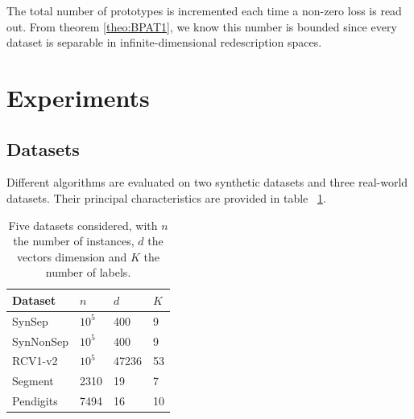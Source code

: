 \documentclass[preprint,12pt,authoryear]{elsarticle}
\begin{document}
The total number of prototypes is incremented each time a non-zero loss is read out. From theorem \ref{theo:BPAT1}, we know this number is bounded since every dataset is separable in infinite-dimensional redescription spaces. 

  



\section{Experiments}
\subsection{Datasets}
\label{subsec:BPAE}

Different algorithms are evaluated on two synthetic datasets and three real-world datasets.  Their principal characteristics are provided in table ~\ref{table:mce}.

\begin{table}[h]
	\caption{Five datasets considered, with $n$ the number of instances, $d$ the vectors dimension and $K$ the number of labels.}
	\label{table:mce}
	\begin{center}
		\begin{tabular}{l l l l}
			{\bf Dataset}  & {\bf $n$} & {\bf $d$} & {\bf $K$}\\
			\hline
			SynSep & $10^5$ 	& 400 	& 9 \\
			
			SynNonSep & $10^5$ & 400 	& 9 \\
			
			RCV1-v2  & $10^5$ 	& 47236 	& 53 \\
			
			Segment & 2310	& 19	& 7	\\
			
			Pendigits 	& 7494	& 16	& 10	\\
		\end{tabular}
	\end{center}
\end{table}
\end{document}
